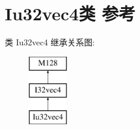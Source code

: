 \hypertarget{class_iu32vec4}{}\section{Iu32vec4类 参考}
\label{class_iu32vec4}
类 Iu32vec4 继承关系图\+:\begin{figure}[H]
\begin{center}
\leavevmode
\includegraphics[height=3.000000cm]{class_iu32vec4}
\end{center}
\end{figure}
